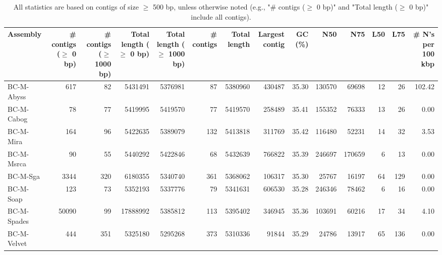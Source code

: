 \documentclass[12pt,a4paper]{article}
\begin{document}
\begin{table}[ht]
\begin{center}
\caption{All statistics are based on contigs of size $\geq$ 500 bp, unless otherwise noted (e.g., "\# contigs ($\geq$ 0 bp)" and "Total length ($\geq$ 0 bp)" include all contigs).}
\begin{tabular}{|l*{13}{|r}|}
\hline
Assembly & \# contigs ($\geq$ 0 bp) & \# contigs ($\geq$ 1000 bp) & Total length ($\geq$ 0 bp) & Total length ($\geq$ 1000 bp) & \# contigs & Total length & Largest contig & GC (\%) & N50 & N75 & L50 & L75 & \# N's per 100 kbp \\ \hline
BC-M-Abyss & 617 & 82 & 5431491 & 5376981 & 87 & 5380960 & 430487 & 35.30 & 130570 & 69698 & 12 & 26 & 102.42 \\ \hline
BC-M-Cabog & 78 & 77 & 5419995 & 5419570 & 77 & 5419570 & 258489 & 35.41 & 155352 & 76333 & 13 & 26 & 0.00 \\ \hline
BC-M-Mira & 164 & 96 & 5422635 & 5389079 & 132 & 5413818 & 311769 & 35.42 & 116480 & 52231 & 14 & 32 & 3.53 \\ \hline
BC-M-Msrca & 90 & 55 & 5440292 & 5422846 & 68 & 5432639 & 766822 & 35.39 & 246697 & 170659 & 6 & 13 & 0.00 \\ \hline
BC-M-Sga & 3344 & 320 & 6180355 & 5340740 & 361 & 5368062 & 106317 & 35.30 & 25767 & 16197 & 64 & 129 & 0.00 \\ \hline
BC-M-Soap & 123 & 73 & 5352193 & 5337776 & 79 & 5341631 & 606530 & 35.28 & 246346 & 78462 & 6 & 16 & 0.00 \\ \hline
BC-M-Spades & 50090 & 99 & 17888992 & 5385812 & 113 & 5395402 & 346945 & 35.36 & 103691 & 60216 & 17 & 34 & 4.10 \\ \hline
BC-M-Velvet & 444 & 351 & 5325180 & 5295268 & 373 & 5310336 & 91844 & 35.29 & 24786 & 13917 & 65 & 136 & 0.00 \\ \hline
\end{tabular}
\end{center}
\end{table}
\end{document}
